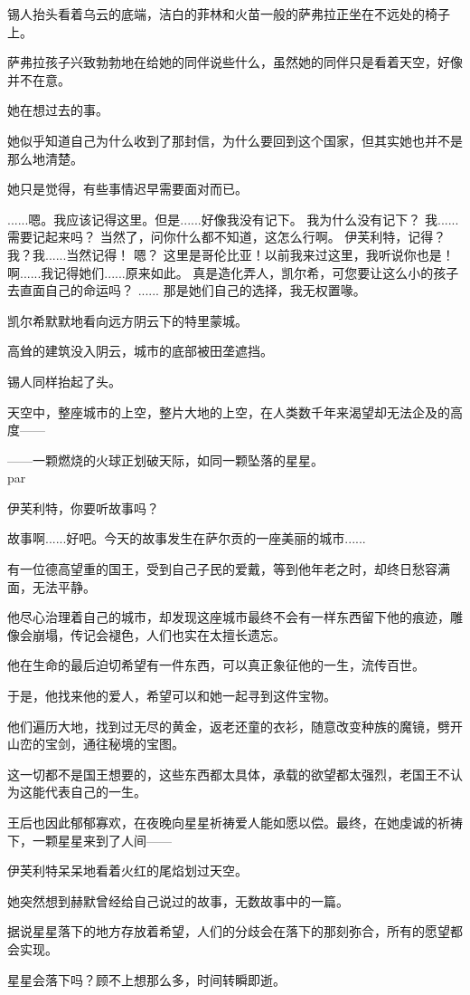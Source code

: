 \documentclass[openany]{book}
\begin{document}
\par
锡人抬头看着乌云的底端，洁白的菲林和火苗一般的萨弗拉正坐在不远处的椅子上。\par
萨弗拉孩子兴致勃勃地在给她的同伴说些什么，虽然她的同伴只是看着天空，好像并不在意。\par
她在想过去的事。\par
她似乎知道自己为什么收到了那封信，为什么要回到这个国家，但其实她也并不是那么地清楚。\par
她只是觉得，有些事情迟早需要面对而已。
\begin{dialogue}
     ......嗯。我应该记得这里。但是......好像我没有记下。
     我为什么没有记下？
     我......需要记起来吗？
     当然了，问你什么都不知道，这怎么行啊。
     伊芙利特，记得？
     我？我......当然记得！
     嗯？
     这里是哥伦比亚！以前我来过这里，我听说你也是！
     啊......我记得她们......原来如此。
     真是造化弄人，凯尔希，可您要让这么小的孩子去直面自己的命运吗？
     ......
     那是她们自己的选择，我无权置喙。
\end{dialogue}
\par
凯尔希默默地看向远方阴云下的特里蒙城。\par
高耸的建筑没入阴云，城市的底部被田垄遮挡。\par
锡人同样抬起了头。\par
天空中，整座城市的上空，整片大地的上空，在人类数千年来渴望却无法企及的高度——\par
——一颗燃烧的火球正划破天际，如同一颗坠落的星星。\\par
\par
伊芙利特，你要听故事吗？\par
故事啊......好吧。今天的故事发生在萨尔贡的一座美丽的城市......\par
{
    有一位德高望重的国王，受到自己子民的爱戴，等到他年老之时，却终日愁容满面，无法平静。\par
    他尽心治理着自己的城市，却发现这座城市最终不会有一样东西留下他的痕迹，雕像会崩塌，传记会褪色，人们也实在太擅长遗忘。\par
    他在生命的最后迫切希望有一件东西，可以真正象征他的一生，流传百世。\par
    于是，他找来他的爱人，希望可以和她一起寻到这件宝物。\par
    他们遍历大地，找到过无尽的黄金，返老还童的衣衫，随意改变种族的魔镜，劈开山峦的宝剑，通往秘境的宝图。\par
    这一切都不是国王想要的，这些东西都太具体，承载的欲望都太强烈，老国王不认为这能代表自己的一生。\par
    王后也因此郁郁寡欢，在夜晚向星星祈祷爱人能如愿以偿。最终，在她虔诚的祈祷下，一颗星星来到了人间——\par
    伊芙利特呆呆地看着火红的尾焰划过天空。\par
    她突然想到赫默曾经给自己说过的故事，无数故事中的一篇。\par
    据说星星落下的地方存放着希望，人们的分歧会在落下的那刻弥合，所有的愿望都会实现。\par
    星星会落下吗？顾不上想那么多，时间转瞬即逝。\par}
\end{document}
